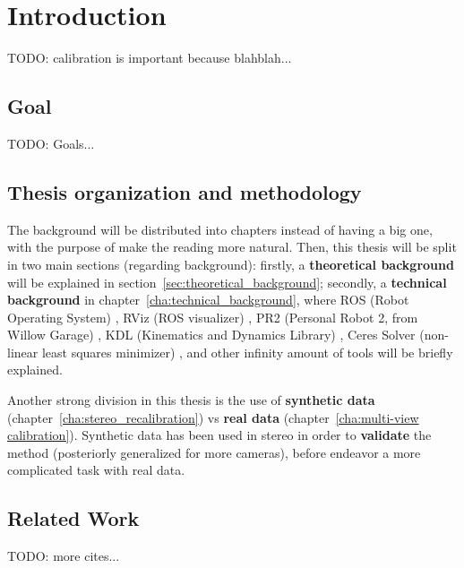 \chapter{Introduction}
\label{cha:intro}


TODO:
calibration is important because blahblah...


\section{Goal}

TODO: Goals...



\section{Thesis organization and methodology}

The background will be distributed into chapters instead of having a big one, with the purpose of make the reading more natural. Then, this thesis will be split in two main sections (regarding background): firstly, a \textbf{theoretical background} will be explained in section~\ref{sec:theoretical_background}; secondly, a \textbf{technical background} in chapter~\ref{cha:technical_background}, where ROS (Robot Operating System) \cite{ROS}, RViz (ROS visualizer) \cite{RViz}, PR2 (Personal Robot 2, from Willow Garage) \cite{PR2}, KDL (Kinematics and Dynamics Library) \cite{KDL}, Ceres Solver (non-linear least squares minimizer) \cite{ceres}, and other infinity amount of tools will be briefly explained.

Another strong division in this thesis is the use of \textbf{synthetic data} (chapter~\ref{cha:stereo_recalibration}) vs \textbf{real data} (chapter~\ref{cha:multi-view calibration}). Synthetic data has been used in stereo in order to \textbf{validate} the method (posteriorly generalized for more cameras), before endeavor a more complicated task with real data.






\section{Related Work}

TODO:
more cites...
